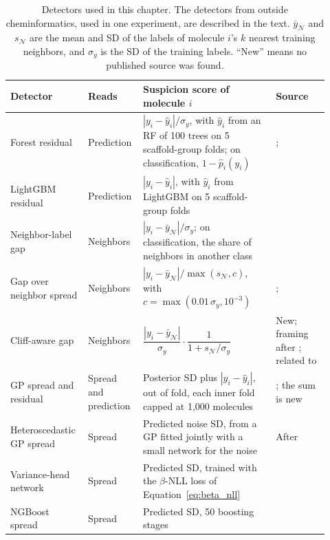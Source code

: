 \begin{table}[htbp]
\centering
\small
\begin{adjustbox}{max width=\textwidth,max totalheight=0.78\textheight}
\begin{tabular}{@{}P{0.22\linewidth}P{0.14\linewidth}P{0.40\linewidth}P{0.16\linewidth}@{}}
\toprule
Detector & Reads & Suspicion score of molecule $i$ & Source \\
\midrule
Forest residual & Prediction & $|y_i - \hat y_i| / \sigma_y$, with $\hat y_i$ from an RF of 100 trees on 5 scaffold-group folds; on classification, $1 - \hat p_i(y_i)$ & \citet{Brodley1999}; \citet{Northcutt2021} \\
LightGBM residual & Prediction & $|y_i - \hat y_i|$, with $\hat y_i$ from LightGBM on 5 scaffold-group folds & \citet{Brodley1999} \\
Neighbor-label gap & Neighbors & $|y_i - \bar y_{\mathcal{N}}| / \sigma_y$; on classification, the share of neighbors in another class & \citet{Wilson1972, Martin2021} \\
Gap over neighbor spread & Neighbors & $|y_i - \bar y_{\mathcal{N}}| / \max(s_{\mathcal{N}}, c)$, with $c = \max(0.01\,\sigma_y, 10^{-3})$ & \citet{Baserud2020}; \citet{Kordos2012} \\
Cliff-aware gap & Neighbors & $\dfrac{|y_i - \bar y_{\mathcal{N}}|}{\sigma_y} \cdot \dfrac{1}{1 + s_{\mathcal{N}}/\sigma_y}$ & New; framing after \citet{Maggiora2006, Stumpfe2012}; related to \citet{Chawla2006} \\
GP spread and residual & Spread and prediction & Posterior SD plus $|y_i - \hat y_i|$, out of fold, each inner fold capped at 1,000 molecules & \citet{Rasmussen2005}; the sum is new \\
Heteroscedastic GP spread & Spread & Predicted noise SD, from a GP fitted jointly with a small network for the noise & After \citet{kersting2007most} \\
Variance-head network & Spread & Predicted SD, trained with the $\beta$-NLL loss of Equation~\ref{eq:beta_nll} & \citet{Seitzer2022} \\
NGBoost spread & Spread & Predicted SD, 50 boosting stages & \citet{Duan2020} \\
\bottomrule
\end{tabular}
\end{adjustbox}
\caption[Detectors.]{Detectors used in this chapter. The detectors from outside cheminformatics, used in one experiment, are described in the text. $\bar y_{\mathcal{N}}$ and $s_{\mathcal{N}}$ are the mean and SD of the labels of molecule $i$'s $k$ nearest training neighbors, and $\sigma_y$ is the SD of the training labels. ``New'' means no published source was found.}
\label{tab:noise:detectors}
\end{table}

